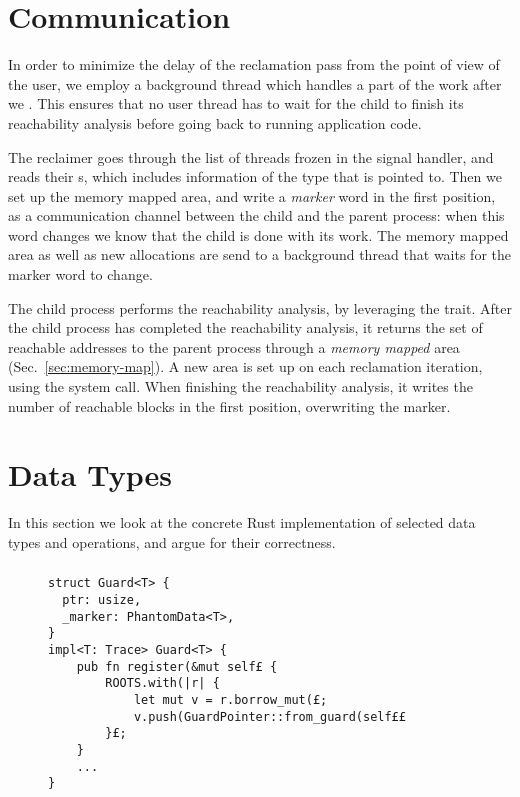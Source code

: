 \section{Communication\label{sec:thread-communication}}

In order to minimize the delay of the reclamation pass from the point of view of the user, we
employ a background thread which handles a part of the work after we . This ensures that
no user thread has to wait for the child to finish its reachability analysis before going back to
running application code.

The reclaimer goes through the list of threads frozen in the signal handler, and reads their
s, which includes information of the type that is pointed to. Then we set up the memory
mapped area, and write a \emph{marker} word in the first position, as a communication channel
between the child and the parent process: when this word changes we know that the child is done
with its work. The memory mapped area as well as new allocations are send to a background thread
that waits for the marker word to change.

The child process performs the reachability analysis, by leveraging the  trait. After
the child process has completed the reachability analysis, it returns the set of reachable
addresses to the parent process through a \emph{memory mapped} area (Sec.~\ref{sec:memory-map}).  A
new area is set up on each reclamation iteration, using the  system call.  When
finishing the reachability analysis, it writes the number of reachable blocks in the first
position, overwriting the marker.





\section{Data Types\label{sec:data-types}}

In this section we look at the concrete Rust implementation of selected data types and operations,
and argue for their correctness.

\subsubsection{}

\begin{figure}[p]
  \begin{lstlisting}[caption=Excerpt of \mc{Guard}s definitions]
struct Guard<T> {
  ptr: usize,
  _marker: PhantomData<T>,
}
impl<T: Trace> Guard<T> {
    pub fn register(&mut self£ {
        ROOTS.with(|r| {
            let mut v = r.borrow_mut(£;
            v.push(GuardPointer::from_guard(self££
        }£;
    }
    ...
}\end{lstlisting}
\end{figure}

